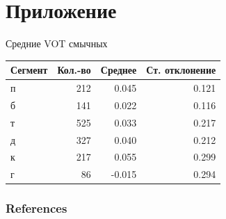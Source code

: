 \documentclass[10 pt, handout]{beamer}
\begin{document}
	\section{Приложение}

\begin{frame}{Средние VOT смычных}

\begin{tabular}{lrrr}
\toprule
\textbf{Сегмент} &  \textbf{Кол.-во} &   \textbf{Среднее} &    \textbf{Ст. отклонение} \\
\midrule
п       &    212 &  0.045 &  0.121 \\
б       &    141 &  0.022 &  0.116 \\
т       &    525 &  0.033 &  0.217 \\
д       &    327 &  0.040 &  0.212 \\
к       &    217 &  0.055 &  0.299 \\
г       &     86 & -0.015 &  0.294 \\
\bottomrule
\end{tabular}

\end{frame}

\begin{frame}[allowframebreaks]
\frametitle{References}
%
\printbibliography
\end{frame}
\end{document}

